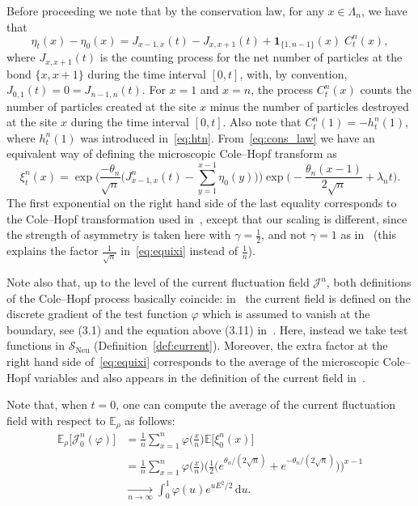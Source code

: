 \documentclass[AHL,Unicode,longabstracts]{cedram}
\DeclareMathOperator{\Neu}{Neu}
\newcommand{\bb}[1]{{\mathbb #1}}
\newcommand{\mc}[1]{{\mathcal #1}}
\renewcommand{\mc}[1]{{\mathcal #1}}
\newcommand{\SN}{\ensuremath{\mc S_{\Neu}}}
\newcommand*{\dd}{\mathrm{d}}
\newcommand*{\du}{\dd u}
\renewcommand{\tfrac}{\frac}
\begin{document}
\begin{rema}
Before proceeding we note that by the conservation law, for any $x\in\Lambda_n$, we have that
\begin{equation}\label{eq:cons_law}
\eta_{t}(x)-\eta_0(x)=J_{x-1,x}(t)-J_{x,x+1}(t)+ \mathbf{1}_{\{1,n-1\}}(x)\;C_t^n(x),
\end{equation}
where $J_{x,x+1}(t)$ is the counting process for the net number of particles at the bond $\{x,x+1\}$ during the time interval $[0,t]$, with, by convention, $J_{0,1}(t)=0=J_{n-1,n}(t)$. For $x=1$ and $x=n$, the process $C_t^n(x)$ counts the number of particles created at the site $x$ minus the number of particles destroyed at the site $x$ during the time interval $[0,t]$. Also note that $C^n_t(1)=-h_t^n(1)$, where $h_t^n(1)$ was introduced in~\eqref{eq:htn}. From~\eqref{eq:cons_law} we have an equivalent way of defining the microscopic Cole--Hopf transform as
\begin{equation}\label{eq:equixi}
\xi_t^n(x) =\exp \bigg(\frac{-\theta_n}{\sqrt n} \bigg(J_{x-1,x}^n(t)-\sum_{y=1}^{x-1} \eta_{0}(y)\bigg)\bigg)\exp\bigg(-\frac{\theta_n(x-1)}{2\sqrt n}+\lambda_n t\bigg).
\end{equation}
The first exponential on the right hand side of the last equality corresponds to the Cole--Hopf transformation used in~\cite{GLM}, except that our scaling is different, since the strength of asymmetry is taken here with $\gamma=\frac12$, and not $\gamma=1$ as in~\cite{GLM} (this explains the factor $\frac{1}{\sqrt n}$ in~\eqref{eq:equixi} instead of $\frac1n$).

Note also that, up to the level of the current fluctuation field $\mc J^n$, both definitions of the Cole--Hopf process basically coincide: in~\cite{GLM} the current field is defined on the discrete gradient of the test function $\varphi$ which is assumed to vanish at the boundary, see (3.1) and the equation above (3.11) in~\cite{GLM}. Here, instead we take test functions in $\SN$ (Definition~\ref{def:current}). Moreover, the extra factor at the right hand side of~\eqref{eq:equixi} corresponds to the average of the microscopic Cole--Hopf variables and also appears in the definition of the current field in~\cite[formula above (3.11)]{GLM}.
\end{rema}



\begin{rema}
Note that, when $t=0$, one can compute the average of the current fluctuation field with respect to $\bb E_\rho$ as follows:
\begin{align*}
\bb E_\rho\big[\mc J_0^n(\varphi) \big]& = \frac{1}{n} \sum_{x=1}^n \varphi\Big(\tfrac x n\Big) \bb E\big[\xi_0^n(x)\big] \\
& = \frac{1}{n}\sum_{x=1}^n \varphi\Big(\tfrac x n\Big) \Big(\tfrac12\big(e^{\theta_n/(2\sqrt n)}+e^{-\theta_n/(2\sqrt n)}\Big)\Big)^{x-1}\\
& \xrightarrow[n\to\infty]{} \int_0^1 \varphi(u) e^{u E^2/2} \,\du.
\end{align*}
\end{rema}
\end{document}
